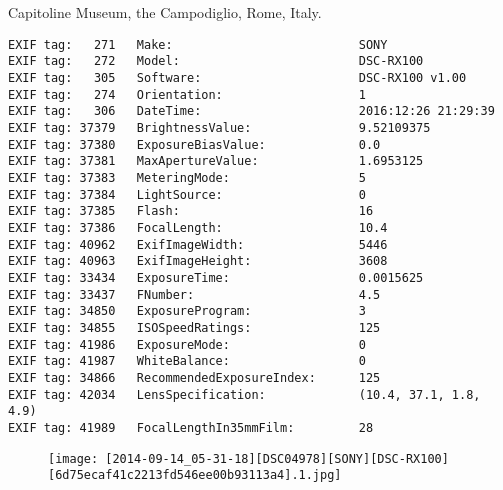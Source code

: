 \section{\protect{}}
\noindent Capitoline Museum, the Campodiglio, Rome, Italy.
\noindent
\begin{lstlisting}
EXIF tag:   271   Make:                          SONY
EXIF tag:   272   Model:                         DSC-RX100
EXIF tag:   305   Software:                      DSC-RX100 v1.00
EXIF tag:   274   Orientation:                   1
EXIF tag:   306   DateTime:                      2016:12:26 21:29:39
EXIF tag: 37379   BrightnessValue:               9.52109375
EXIF tag: 37380   ExposureBiasValue:             0.0
EXIF tag: 37381   MaxApertureValue:              1.6953125
EXIF tag: 37383   MeteringMode:                  5
EXIF tag: 37384   LightSource:                   0
EXIF tag: 37385   Flash:                         16
EXIF tag: 37386   FocalLength:                   10.4
EXIF tag: 40962   ExifImageWidth:                5446
EXIF tag: 40963   ExifImageHeight:               3608
EXIF tag: 33434   ExposureTime:                  0.0015625
EXIF tag: 33437   FNumber:                       4.5
EXIF tag: 34850   ExposureProgram:               3
EXIF tag: 34855   ISOSpeedRatings:               125
EXIF tag: 41986   ExposureMode:                  0
EXIF tag: 41987   WhiteBalance:                  0
EXIF tag: 34866   RecommendedExposureIndex:      125
EXIF tag: 42034   LensSpecification:             (10.4, 37.1, 1.8, 4.9)
EXIF tag: 41989   FocalLengthIn35mmFilm:         28

\end{lstlisting}
\clearpage
\begin{figure}
\raggedleft
\texttt{[image: [2014-09-14\_05-31-18][DSC04978][SONY][DSC-RX100][6d75ecaf41c2213fd546ee00b93113a4].1.jpg]}
\end{figure}


\clearpage
